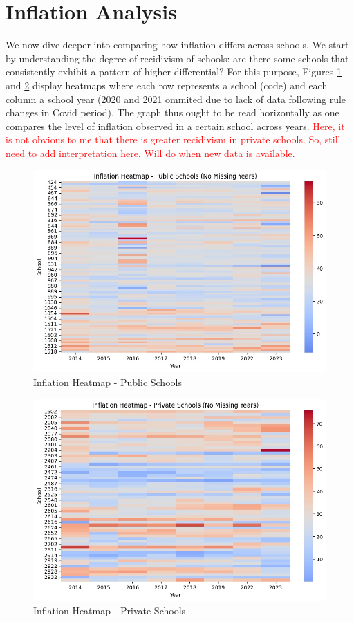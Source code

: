 \documentclass{article}
\begin{document}
\section{Inflation Analysis}
We now dive deeper into comparing how inflation differs across schools. We start by understanding the degree of recidivism of schools: are there some schools that consistently exhibit a pattern of higher differential? For this purpose, Figures \ref{fig:HeatmapPublicNoMissing} and \ref{fig:HeatmapPrivateNoMissing} display heatmaps where each row represents a school (code) and each column a school year (2020 and 2021 ommited due to lack of data following rule changes in Covid period). The graph thus ought to be read horizontally as one compares the level of inflation observed in a certain school across years. \textcolor{red}{Here, it is not obvious to me that there is greater recidivism in private schools. So, still need to add interpretation here. Will do when new data is available.}

\begin{figure}
    \centering
    \includegraphics[width=0.8\linewidth]{Figures/HeatmapPublicNoMissing.jpeg}
    \caption{Inflation Heatmap - Public Schools}
    \label{fig:HeatmapPublicNoMissing}
\end{figure}

\begin{figure}
    \centering
    \includegraphics[width=0.8\linewidth]{Figures/HeatmapPrivateNoMissing.jpeg}
    \caption{Inflation Heatmap - Private Schools}
    \label{fig:HeatmapPrivateNoMissing}
\end{figure}
\end{document}
